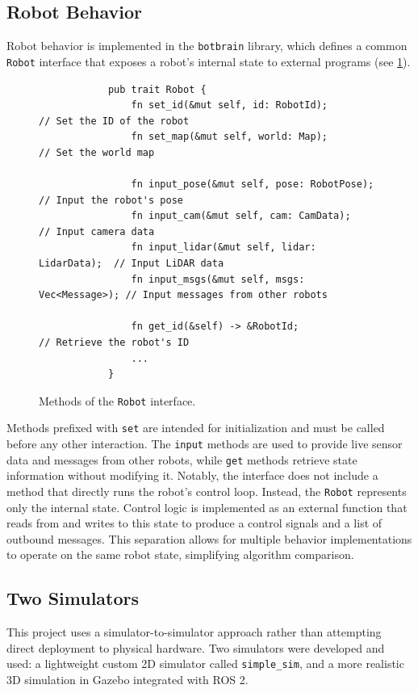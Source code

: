 \subsection{Robot Behavior}
Robot behavior is implemented in the \texttt{botbrain} library, which defines a common \texttt{Robot} interface that exposes a robot’s internal state to external programs (see \cref{fig:robot-interface}).

\begin{figure}[H]
    \begin{center}
        \begin{verbatim}
            pub trait Robot {
                fn set_id(&mut self, id: RobotId);            // Set the ID of the robot
                fn set_map(&mut self, world: Map);            // Set the world map

                fn input_pose(&mut self, pose: RobotPose);    // Input the robot's pose
                fn input_cam(&mut self, cam: CamData);        // Input camera data
                fn input_lidar(&mut self, lidar: LidarData);  // Input LiDAR data
                fn input_msgs(&mut self, msgs: Vec<Message>); // Input messages from other robots

                fn get_id(&self) -> &RobotId;                 // Retrieve the robot's ID
                ...
            }
        \end{verbatim}
    \end{center}
    \caption{Methods of the \texttt{Robot} interface.}
    \label{fig:robot-interface}
\end{figure}

Methods prefixed with \texttt{set} are intended for initialization and must be called before any other interaction. The \texttt{input} methods are used to provide live sensor data and messages from other robots, while \texttt{get} methods retrieve state information without modifying it. Notably, the interface does not include a method that directly runs the robot’s control loop. Instead, the \texttt{Robot} represents only the internal state. Control logic is implemented as an external function that reads from and writes to this state to produce a control signals and a list of outbound messages. This separation allows for multiple behavior implementations to operate on the same robot state, simplifying algorithm comparison.

\subsection{Two Simulators}
This project uses a simulator-to-simulator approach rather than attempting direct deployment to physical hardware. Two simulators were developed and used: a lightweight custom 2D simulator called \texttt{simple\_sim}, and a more realistic 3D simulation in Gazebo integrated with ROS 2. \\

